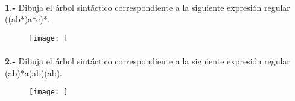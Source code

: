 \documentclass[11pt,a4paper]{report}
\begin{document}
\paragraph{}

\paragraph{}
\textbf{1.-} Dibuja el árbol sintáctico correspondiente a la siguiente expresión regular ((a\textbar b*)a*c)*. 
\begin{figure}[ht!]
\centering
\texttt{[image: ]}
\end{figure}\paragraph{}
\textbf{2.-} Dibuja el árbol sintáctico correspondiente a la siguiente expresión regular (a\textbar b)*a(a\textbar b)(a\textbar b). 
\begin{figure}[ht!]
\centering
\texttt{[image: ]}
\end{figure}
\end{document}
